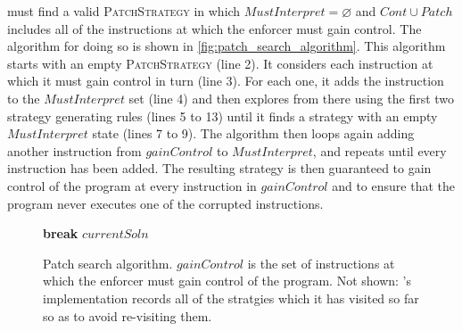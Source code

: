 {\Technique} must find a valid \textsc{PatchStrategy} in which
$\mathit{MustInterpret} = \varnothing$ and $\mathit{Cont} \cup
\mathit{Patch}$ includes all of the instructions at which the enforcer
must gain control.  The algorithm for doing so is shown in
\autoref{fig:patch_search_algorithm}.  This algorithm starts with an
empty \textsc{PatchStrategy} (line 2).  It considers each instruction
at which it must gain control in turn (line 3).  For each one, it adds
the instruction to the $\mathit{MustInterpret}$ set (line 4) and then
explores from there using the first two strategy generating rules
(lines 5 to 13) until it finds a strategy with an empty
$\mathit{MustInterpret}$ state (lines 7 to 9).  The algorithm then
loops again adding another instruction from $\mathit{gainControl}$ to
$\mathit{MustInterpret}$, and repeats until every instruction has been
added.  The resulting strategy is then guaranteed to gain control of
the program at every instruction in $\mathit{gainControl}$ and to
ensure that the program never executes one of the corrupted
instructions.

\begin{figure}
  \begin{algorithmic}[1]
      \While {\true}
          \State \textbf{break}
        \Else
        \EndIf
      \EndWhile
    \EndFor
    \State \Return $\mathit{currentSoln}$
    \EndProcedure
  \end{algorithmic}
  \caption{Patch search algorithm.  $\mathit{gainControl}$ is the set
    of instructions at which the enforcer must gain control of the
    program.  Not shown: {\implementation}'s implementation records
    all of the stratgies which it has visited so far so as to avoid
    re-visiting them.}
  \label{fig:patch_search_algorithm}
\end{figure}

